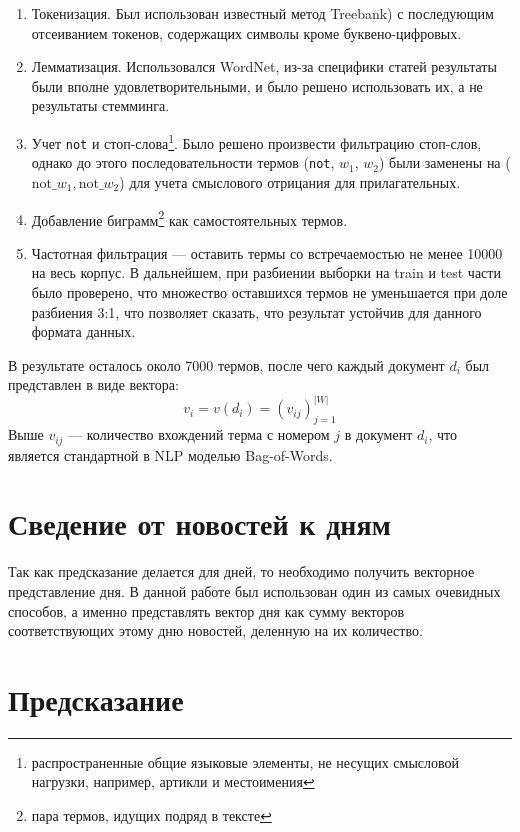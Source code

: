 \documentclass[pdftex,ptm,14pt,a4paper]{report}
\begin{document}
\begin{enumerate}

\item Токенизация. Был использован известный метод Treebank\cite{treebank}) с последующим отсеиванием токенов,
содержащих символы кроме буквено-цифровых.
\item Лемматизация. Использовался WordNet\cite{wordnet}, из-за специфики статей результаты были вполне удовлетворительными,
и было решено использовать их, а не результаты стемминга.
\item Учет \texttt{not} и стоп-слова\footnote{распространенные общие языковые элементы, не несущих смысловой нагрузки,
например, артикли и местоимения}. Было решено произвести фильтрацию стоп-слов, однако до этого последовательности
термов (\texttt{not}, $w_1$, $w_2$) были заменены на ($\text{not\_} w_1, \text{not\_} w_2$) для учета смыслового отрицания
для прилагательных.
\item Добавление биграмм\footnote{пара термов, идущих подряд в тексте} как самостоятельных термов.
\item Частотная фильтрация --- оставить термы со встречаемостью не менее 10000 на весь корпус. В дальнейшем, при разбиении
выборки на train и test части было проверено, что множество оставшихся термов не уменьшается при доле
разбиения 3:1, что позволяет сказать, что результат устойчив для данного формата данных.

\end{enumerate}

В результате осталось около 7000 термов, после чего каждый документ $d_i$ был представлен в виде вектора:
\begin{equation}
v_i = v(d_i) = (v_{ij})_{j=1}^{|W|}
\end{equation}
Выше $v_{ij}$ --- количество вхождений терма с номером $j$ в документ $d_i$, что является стандартной в NLP
моделью Bag-of-Words.

\section{Сведение от новостей к дням}

Так как предсказание делается для дней, то необходимо получить векторное представление дня.
В данной работе был использован один из самых очевидных способов, а именно представлять вектор дня как сумму векторов соответствующих этому дню новостей, деленную на их количество.

\section{Предсказание}
\end{document}
